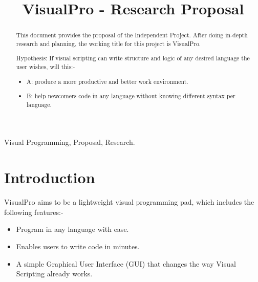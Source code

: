 \documentclass[conference]{IEEEtran}
\begin{document}
	\title{VisualPro - Research Proposal}

	\author{
	}

     \maketitle
    
    \thispagestyle{plain}
    \pagestyle{plain}
    
    \tableofcontents
	  \vspace{.5cm}
	
    \begin{abstract}
      This document provides the proposal of the Independent Project. After doing in-depth research and planning, the working title for this project is VisualPro.

      Hypothesis: If visual scripting can write structure and logic of any desired language the user wishes, will this:-
        \begin{itemize}
          \item A: produce a more productive and better work environment.
          \item B: help newcomers code in any language without knowing different syntax per language.
        \end{itemize}
       
    \end{abstract}

    \begin{IEEEkeywords}
        Visual Programming, Proposal, Research.
    \end{IEEEkeywords}
  
    \section{Introduction}
      VisualPro aims to be a lightweight visual programming pad, which includes the following features:-
      \begin{itemize}
        \item Program in any language with ease.
        \item Enables users to write code in minutes.
        \item A simple Graphical User Interface (GUI) that changes the way Visual Scripting already works.
      \end{itemize}
  
\end{document}
